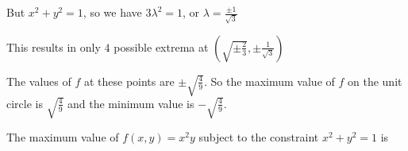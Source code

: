 \documentclass{ximera}
\begin{document}
\begin{question}
\begin{solution}
\begin{hint}
			But $x^2+y^2=1$, so we have $3\lambda^2 = 1$, or $\lambda =\frac{\pm 1}{\sqrt{3}}$
		\end{hint}
		\begin{hint}	
			This results in only $4$ possible extrema at $(\sqrt{\pm \frac{2}{3}}, \pm \frac{1}{\sqrt{3}})$
		\end{hint}
		\begin{hint}
			The values of $f$ at these points are $\pm \sqrt{\frac{4}{9}}$.  So the maximum value of $f$ on the unit circle 
			is $\sqrt{\frac{4}{9}}$ and the minimum value is $-\sqrt{\frac{4}{9}}$. 
		\end{hint}
		The maximum value of $f(x,y) = x^2y$ subject to the constraint $x^2+y^2=1$ is 
		\end{solution}
	\end{question}
	
\end{document}
